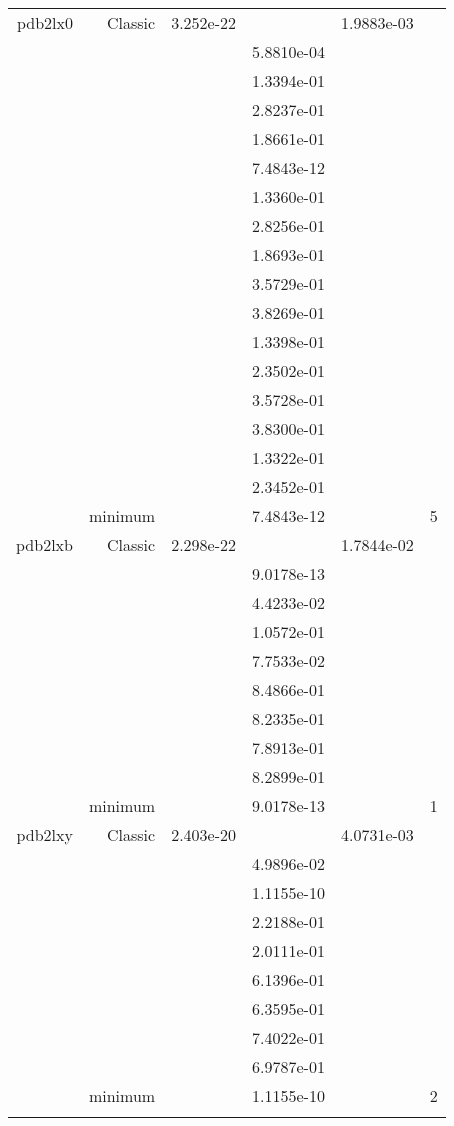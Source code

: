 \begin{xltabular}{\textwidth}{r|rS[table-format=1.3e+2]S[table-format=1.4e+2]S[table-format=1.4e+2]S[table-format=-1.5]}
pdb2lx0 & Classic & 3.252e-22 &  & 1.9883e-03 & \\
&  &  & 5.8810e-04 & & \\
&  &  & 1.3394e-01 & & \\
&  &  & 2.8237e-01 & & \\
&  &  & 1.8661e-01 & & \\
&  &  & 7.4843e-12 & & \\
&  &  & 1.3360e-01 & & \\
&  &  & 2.8256e-01 & & \\
&  &  & 1.8693e-01 & & \\
&  &  & 3.5729e-01 & & \\
&  &  & 3.8269e-01 & & \\
&  &  & 1.3398e-01 & & \\
&  &  & 2.3502e-01 & & \\
&  &  & 3.5728e-01 & & \\
&  &  & 3.8300e-01 & & \\
&  &  & 1.3322e-01 & & \\
&  &  & 2.3452e-01 & & \\
& minimum &  & 7.4843e-12 & & 5 \\  \addlinespace
pdb2lxb & Classic & 2.298e-22 &  & 1.7844e-02 & \\
&  &  & 9.0178e-13 & & \\
&  &  & 4.4233e-02 & & \\
&  &  & 1.0572e-01 & & \\
&  &  & 7.7533e-02 & & \\
&  &  & 8.4866e-01 & & \\
&  &  & 8.2335e-01 & & \\
&  &  & 7.8913e-01 & & \\
&  &  & 8.2899e-01 & & \\
& minimum &  & 9.0178e-13 & & 1 \\  \addlinespace
pdb2lxy & Classic & 2.403e-20 &  & 4.0731e-03 & \\
&  &  & 4.9896e-02 & & \\
&  &  & 1.1155e-10 & & \\
&  &  & 2.2188e-01 & & \\
&  &  & 2.0111e-01 & & \\
&  &  & 6.1396e-01 & & \\
&  &  & 6.3595e-01 & & \\
&  &  & 7.4022e-01 & & \\
&  &  & 6.9787e-01 & & \\
& minimum &  & 1.1155e-10 & & 2 \\  \addlinespace

\end{xltabular}

